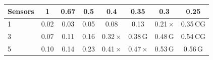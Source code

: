 \begin{tabular}{@{}lccccccc@{}}
\toprule
Sensors & 1 & 0.67 & 0.5 & 0.4 & 0.35 & 0.3 & 0.25 \\
\midrule
1 & 0.02 & 0.03 & 0.05 & 0.08 & 0.13 & 0.21\,{\scriptsize $\times$} & 0.35\,{\scriptsize CG} \\
3 & 0.07 & 0.11 & 0.16 & 0.32\,{\scriptsize $\times$} & 0.38\,{\scriptsize G} & 0.48\,{\scriptsize G} & 0.54\,{\scriptsize CG} \\
5 & 0.10 & 0.14 & 0.23 & 0.41\,{\scriptsize $\times$} & 0.47\,{\scriptsize $\times$} & 0.53\,{\scriptsize G} & 0.56\,{\scriptsize G} \\
\bottomrule
\end{tabular}
